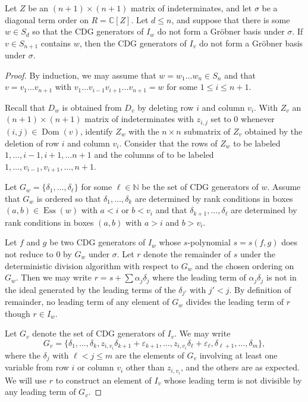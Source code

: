 \documentclass[ALCO,Unicode,published]{cedram}
\DeclareMathOperator{\Ess}{Ess}
\DeclareMathOperator{\Dom}{Dom}
\begin{document}
\begin{theorem}\label{onlyif}
Let $Z$ be an $(n+1) \times (n+1)$ matrix of indeterminates, and let $\sigma$ be a diagonal term order on $R=\mathbb{C}[Z]$.  Let $d \leq n$, and suppose that there is some $w \in S_d$ so that the CDG generators of $I_w$ do not form a Gr\"obner basis under $\sigma$.  If $v \in S_{n+1}$ contains $w$, then the CDG generators of $I_v$ do not form a  Gr\"obner basis under $\sigma$.
\end{theorem}
\begin{proof}
By induction, we may assume that $w = w_1 \ldots w_n \in S_n$ and that $v = v_1 \ldots v_{n+1}$ with $v_1 \ldots v_{i-1} v_{i+1} \ldots v_{n+1} = w$ for some $ 1 \leq i \leq n+1$.  

Recall that $D_w$ is obtained from $D_v$ by deleting row $i$ and column $v_i$.  With $Z_v$ an $(n+1) \times (n+1)$ matrix of indeterminates with $z_{i,j}$ set to $0$ whenever $(i,j) \in \Dom(v)$, identify $Z_w$ with the $n \times n$ submatrix of $Z_v$ obtained by the deletion of row $i$ and column $v_i$.   Consider that the rows of $Z_w$ to be labeled $1, \ldots, i-1, i+1, \ldots n+1$ and the columns of to be labeled $1, \ldots, v_{i-1},v_{i+1}, \ldots, n+1$.   

Let $G_w = \{\delta_1,\ldots, \delta_\ell\}$ for some $\ell \in \mathbb{N}$ be the set of CDG generators of $w$.  Assume that $G_w$ is ordered so that $\delta_1, \ldots, \delta_k$ are determined by rank conditions in boxes $(a,b) \in \Ess(w)$ with $a<i$ or $b<v_i$ and that $\delta_{k+1}, \ldots, \delta_\ell$ are determined by rank conditions in boxes $(a,b)$ with $a>i$ and $b>v_i$.  

Let $f$ and $g$ be two CDG generators of $I_w$ whose $s$-polynomial $s = s(f,g)$ does not reduce to $0$ by $G_w$ under $\sigma$.  Let $r$ denote the remainder of $s$ under the deterministic division algorithm with respect to $G_w$ and the chosen ordering on $G_w$.  Then we may write $r = s+\sum \alpha_j \delta_j$ where the leading term of $\alpha_j \delta_j$ is not in the ideal generated by the leading terms of the $\delta_{j'}$ with $j'<j$.  By definition of remainder, no leading term of any element of $G_w$ divides the leading term of $r$ though $r \in I_w$.

Let $G_v$ denote the set of CDG generators of $I_v$.  We may write \[
G_v = \{\delta_1, \ldots, \delta_k, z_{i,v_i}\delta_{k+1}+\varepsilon_{k+1}, \ldots, z_{i,v_i}\delta_{\ell}+\varepsilon_{\ell}, \delta_{\ell+1}, \ldots, \delta_{m}\},
\] where the $\delta_j$ with $\ell < j \leq m$ are the elements of $G_v$ involving at least one variable from row $i$ or column $v_i$ other than $z_{i,v_i}$, and the others are as expected.  We will use $r$ to construct an element of $I_v$ whose leading term is not divisible by any leading term of $G_v$.  


\end{proof}
\end{document}
